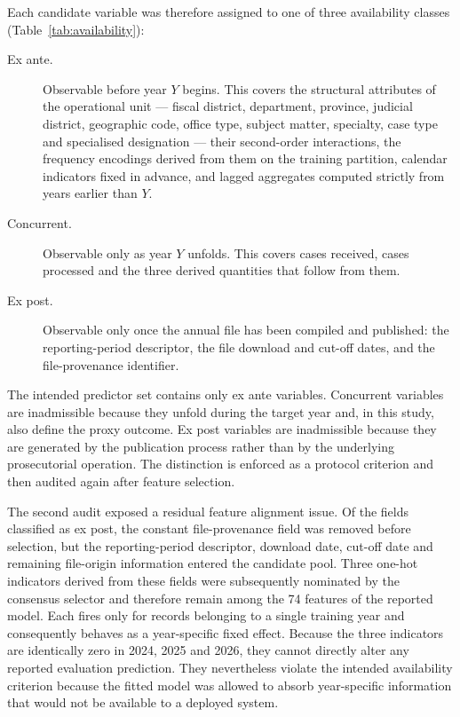 \documentclass[sn-vancouver,Numbered]{sn-jnl}
\begin{document}
Each candidate variable was therefore assigned to one of three availability classes (Table~\ref{tab:availability}):

\begin{description}
\item[Ex ante.] Observable before year $Y$ begins. This covers the structural attributes of the operational unit --- fiscal district, department, province, judicial district, geographic code, office type, subject matter, specialty, case type and specialised designation --- their second-order interactions, the frequency encodings derived from them on the training partition, calendar indicators fixed in advance, and lagged aggregates computed strictly from years earlier than $Y$.
\item[Concurrent.] Observable only as year $Y$ unfolds. This covers cases received, cases processed and the three derived quantities that follow from them.
\item[Ex post.] Observable only once the annual file has been compiled and published: the reporting-period descriptor, the file download and cut-off dates, and the file-provenance identifier.
\end{description}

The intended predictor set contains only ex ante variables. Concurrent variables are inadmissible because they unfold during the target year and, in this study, also define the proxy outcome. Ex post variables are inadmissible because they are generated by the publication process rather than by the underlying prosecutorial operation. The distinction is enforced as a protocol criterion and then audited again after feature selection.

The second audit exposed a residual feature alignment issue. Of the fields classified as ex post, the constant file-provenance field was removed before selection, but the reporting-period descriptor, download date, cut-off date and remaining file-origin information entered the candidate pool. Three one-hot indicators derived from these fields were subsequently nominated by the consensus selector and therefore remain among the 74 features of the reported model. Each fires only for records belonging to a single training year and consequently behaves as a year-specific fixed effect. Because the three indicators are identically zero in 2024, 2025 and 2026, they cannot directly alter any reported evaluation prediction. They nevertheless violate the intended availability criterion because the fitted model was allowed to absorb year-specific information that would not be available to a deployed system.
\end{document}
